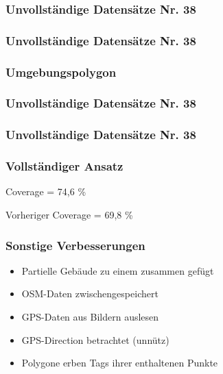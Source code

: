\begin{frame}
  \frametitle{Unvollständige Datensätze \hfill Nr. 38}
\end{frame}


\begin{frame}
  \frametitle{Unvollständige Datensätze \hfill Nr. 38}
\end{frame}


\begin{frame}
  \frametitle{Umgebungspolygon}
\end{frame}


\begin{frame}
  \frametitle{Unvollständige Datensätze \hfill Nr. 38}
\end{frame}

\begin{frame}
  \frametitle{Unvollständige Datensätze \hfill Nr. 38}
\end{frame}


\begin{frame}
  \frametitle{Vollständiger Ansatz}
  \begin{center}
  \huge{Coverage = 74,6 \%}
  \end{center}
  \begin{center}
  Vorheriger Coverage =  69,8 \%
  \end{center}
\end{frame}

\begin{frame}
  \frametitle{Sonstige Verbesserungen}
  \begin{itemize}
    \item<0-> Partielle Gebäude zu einem zusammen gefügt
    \item<1-> OSM-Daten zwischengespeichert
    \item<2-> GPS-Daten aus Bildern auslesen
    \item<3-> GPS-Direction betrachtet (unnütz)
    \item<4-> Polygone erben Tags ihrer enthaltenen Punkte
  \end{itemize}
\end{frame}

